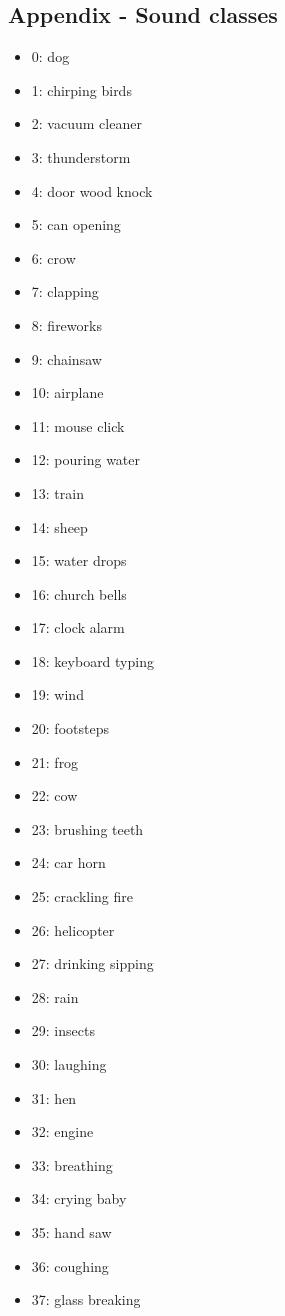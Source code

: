 \documentclass{article}
\begin{document}
\begin{sloppy}
\section{Appendix - Sound classes}
\label{sec:Appendix}
\begin{itemize}
  \item 0: dog
  \item 1: chirping birds
  \item 2: vacuum cleaner
  \item 3: thunderstorm
  \item 4: door wood knock
  \item 5: can opening
  \item 6: crow
  \item 7: clapping
  \item 8: fireworks
  \item 9: chainsaw
  \item 10: airplane
  \item 11: mouse click
  \item 12: pouring water
  \item 13: train
  \item 14: sheep
  \item 15: water drops
  \item 16: church bells
  \item 17: clock alarm
  \item 18: keyboard typing
  \item 19: wind
  \item 20: footsteps
  \item 21: frog
  \item 22: cow
  \item 23: brushing teeth
  \item 24: car horn
  \item 25: crackling fire
  \item 26: helicopter
  \item 27: drinking sipping
  \item 28: rain
  \item 29: insects
  \item 30: laughing
  \item 31: hen
  \item 32: engine
  \item 33: breathing
  \item 34: crying baby
  \item 35: hand saw
  \item 36: coughing
  \item 37: glass breaking

\end{itemize}
\end{sloppy}
\end{document}
